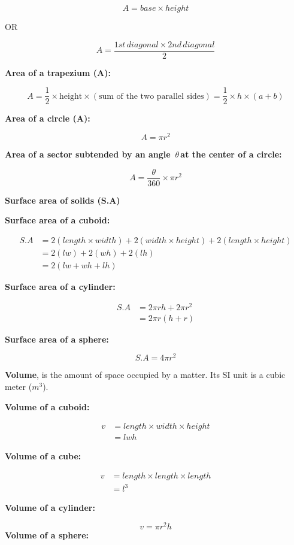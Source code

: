 \documentclass[
  a4paperpaper,
]{scrbook}
\begin{document}
\[A=base \times height   \]

OR

\[A=\frac{1st\, diagonal \times 2nd \,diagonal}{2}\]

\textbf{Area of a trapezium  (A):}

\[
A = \frac{1}{2} \times \text{height} \times \left(\text{sum of the two parallel sides}\right) = \frac{1}{2} \times h \times (a + b)
\]

\textbf{Area of a circle (A):}

\[A=\pi r^2\]

\textbf{Area of a sector subtended by an angle \,$\theta $\,at the center of a circle:}

\[A=\frac{\theta}{360} \times\pi r^2\]

\centerline{\textbf{Surface area of solids (S.A)}}

\textbf{Surface area of a cuboid:}

\begin{align*}
S.A&=2(length \times width)+2(width \times height)+2(length\times height)\\
&=2(lw)+2(wh)+2(lh)\\
&=2(lw+wh+lh)
\end{align*}

\textbf{Surface area of a cylinder:}

\begin{align*}
S.A&=2\pi rh+2\pi r^2\\&=2\pi r(h+r)
\end{align*}

\textbf{Surface area of a sphere:}

\[S.A=4\pi r^2\]

\textbf{Volume}, is the amount of space occupied by a matter. Its SI
unit is a cubic meter (\(m^3\)).

\textbf{Volume of a cuboid:}

\begin{align*}
v&=length \times width \times height\\&=lwh
\end{align*}

\textbf{Volume of a cube:}

\begin{align*}
v&=length \times length \times length \\
&=l^3 
\end{align*}

\textbf{Volume of a cylinder:}

\[ v=\pi r^2 h\] \textbf{Volume of a sphere:}
\end{document}
